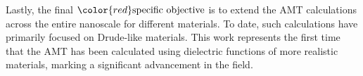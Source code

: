 Lastly, the final ${\color{red}\text{specific objective}}$ is to extend the AMT calculations across the entire nanoscale for different materials. To date, such calculations have primarily focused on Drude-like materials. This work represents the first time that the AMT has been calculated using dielectric functions of more realistic materials, marking a significant advancement in the field.